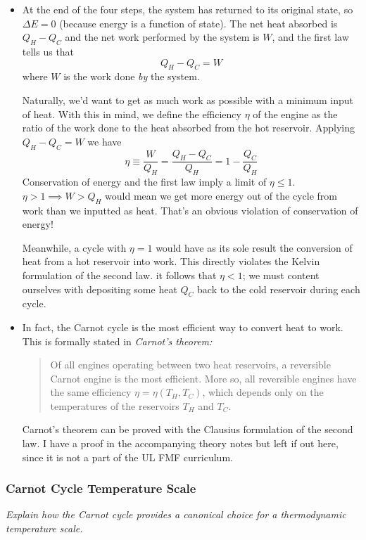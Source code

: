 \documentclass[11pt, a4paper]{article}
\begin{document}
\begin{itemize}
	\item At the end of the four steps, the system has returned to its original state, so $ \Delta E = 0 $ (because energy is a function of state). The net heat absorbed is $ Q_{H} - Q_{C} $ and the net work performed by the system is $ W $, and the first law tells us that
	\begin{equation*}
		Q_{H} - Q_{C} = W
	\end{equation*}
	where $ W $ is the work done \textit{by} the system.
	
	Naturally, we'd want to get as much work as possible with a minimum input of heat. With this in mind, we define the efficiency $ \eta $ of the engine as the ratio of the work done to the heat absorbed from the hot reservoir. Applying $ Q_{H} - Q_{C} = W $ we have
	\begin{equation*}
		\eta \equiv \frac{W}{Q_{H}} = \frac{Q_{H}-Q_{C}}{Q_{H}} = 1 - \frac{Q_{C}}{Q_{H}}
	\end{equation*}
	Conservation of energy and the first law imply a limit of $ \eta \leq 1$. $ \eta > 1 \implies W > Q_{H} $ would mean we get more energy out of the cycle from work than we inputted as heat. That's an obvious violation of conservation of energy! 
	
	Meanwhile, a cycle with $ \eta = 1 $ would have as its sole result the conversion of heat from a hot reservoir into work. This directly violates the Kelvin formulation of the second law. it follows that $ \eta < 1 $; we must content ourselves with depositing some heat $ Q_{C} $ back to the cold reservoir during each cycle. 
	 
	\item In fact, the Carnot cycle is the most efficient way to convert heat to work. This is formally stated in \textit{Carnot's theorem:}
	\begin{quote}
	 	Of all engines operating between two heat reservoirs, a reversible Carnot engine is the most efficient. More so, all reversible engines have the same efficiency $ \eta = \eta (T_{H}, T_{C}) $, which depends only on the temperatures of the reservoirs $ T_{H} $ and $ T_{C} $.
	\end{quote}
	Carnot's theorem can be proved with the Clausius formulation of the second law. I have a proof in the accompanying theory notes but left if out here, since it is not a part of the UL FMF curriculum.
\end{itemize}
	
	
\subsubsection{Carnot Cycle Temperature Scale}
\textit{Explain how the Carnot cycle provides a canonical choice for a thermodynamic temperature scale.}
\end{document}
